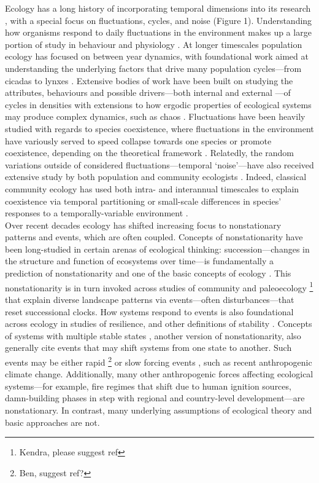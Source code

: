 \documentclass[11pt,a4paper,oneside]{article}
\begin{document}
Ecology has a long history of incorporating temporal dimensions into its research \citep{clementsbook}, with a special focus on fluctuations, cycles, and noise (Figure 1). Understanding how organisms respond to daily fluctuations in the environment makes up a large portion of study in behaviour \citep{macarthur1958} and physiology \citep{Lambers:2008jb}. At longer timescales population ecology has focused on between year dynamics, with foundational work aimed at understanding the underlying factors that drive many population cycles---from cicadas to lynxes \citep{Krebs2001,Yang:2004zd}. Extensive bodies of work have been built on studying the attributes, behaviours and possible drivers---both internal \citep{Gurney1985} and external \citep{Hallett:2004oj}---of cycles in densities with extensions to how ergodic properties of ecological systems may produce complex dynamics, such as chaos \citep{May1976}. Fluctuations have been heavily studied with regards to species coexistence, where fluctuations in the environment have variously served to speed collapse towards one species or promote coexistence, depending on the theoretical framework \citep{Chesson:1997dz}. Relatedly, the random variations outside of considered fluctuations---temporal `noise'---have also received extensive study by both population \citep{Ripa1996,Kaitala1997,Bjornstad:1999kl} and community ecologists \citep{Chesson:2000vd}. Indeed, classical community ecology has used both intra- \citep{parrish1979,Albrecht:2001id} and interannual \citep{Chesson:1997dz} timescales to explain coexistence via temporal partitioning or small-scale differences in species' responses to a temporally-variable environment \citep{macarthur1958,Hutchinson:1961ui}. \\

Over recent decades ecology has shifted increasing focus to nonstationary patterns and events, which are often coupled. Concepts of nonstationarity have been long-studied in certain arenas of ecological thinking: succession---changes in the structure and function of ecosystems over time---is fundamentally a prediction of nonstationarity and one of the basic concepts of ecology \citep{clementsbook,gleason1926}. This nonstationarity is in turn invoked across studies of community \citep{Levin:1992rg} and paleoecology \footnote{Kendra, please suggest ref} that explain diverse landscape patterns via events---often disturbances---that reset successional clocks. How systems respond to events is also foundational across ecology in studies of resilience, and other definitions of stability \citep{Grimm:1997}. Concepts of systems with multiple stable states \citep{yang2010}, another version of nonstationarity, also generally cite events that may shift systems from one state to another. Such events may be either rapid \footnote{Ben, suggest ref?} or slow forcing events \citep{Foley2003}, such as recent anthropogenic climate change. Additionally, many other anthropogenic forces affecting ecological systems---for example, fire regimes that shift due to human ignition sources, damn-building phases in step with regional and country-level development---are nonstationary. In contrast, many underlying assumptions of ecological theory and basic approaches are not.\\
\end{document}
